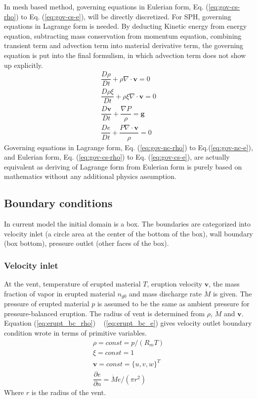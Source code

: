 \documentclass[journal abbreviation, manuscript]{copernicus}
\begin{document}
In mesh based method, governing equations in Eulerian form, Eq. (\ref{eq:gov-cs-rho}) to Eq. (\ref{eq:gov-cs-e}), will be directly discretized. For SPH, governing equations in Lagrange form is needed. By deducting Kinetic energy from energy equation, subtracting mass conservation from momentum equation, combining transient term and advection term into material derivative term, the governing equation is put into the final formulism, in which advection term does not show up explicitly.
\begin{align}
\dfrac{D \rho}{D t} + \rho \nabla \cdot \textbf{v} = 0 \label{eq:gov-nc-rho}\\
\dfrac{D \rho \xi}{D t} + \rho \xi \nabla \cdot \textbf{v} = 0 \label{eq:gov-nc-ks}\\
\dfrac{D \textbf{v}}{D t} + \dfrac{\nabla P}{\rho} =\textbf{g} \label{eq:gov-nc-v}\\
\dfrac{D e}{D t} + \dfrac{P \nabla \cdot \textbf{v}}{\rho} = 0 \label{eq:gov-nc-e}
\end{align}
Governing equations in Lagrange form, Eq. (\ref{eq:gov-nc-rho}) to Eq.(\ref{eq:gov-nc-e}), and Eulerian form, Eq. (\ref{eq:gov-cs-rho}) to Eq. (\ref{eq:gov-cs-e}), are actually equivalent as deriving of Lagrange form from Eulerian form is purely based on mathematics without any additional physics assumption.
\subsection{Boundary conditions}
In current model the initial domain is a box. The boundaries are categorized into velocity inlet (a circle area at the center of the bottom of the box), wall boundary (box bottom), pressure outlet (other faces of the box).
\subsubsection{Velocity inlet}
At the vent, temperature of erupted material $T$, eruption velocity $\textbf{v}$, the mass fraction of vapor in erupted material $n_{g0}$ and mass discharge rate $\dot M$ is given. The pressure of erupted material $p$ is assumed to be the same as ambient pressure for pressure-balanced eruption. The radius of vent is determined from $\rho$, $\dot M$ and $\textbf{v}$. Equation (\ref{eq:erupt_bc_rho}) ~ (\ref{eq:erupt_bc_e}) gives velocity outlet boundary condition wrote in terms of primitive variables.
\begin{align}
\rho =const = p/(R_m T) \label{eq:erupt_bc_rho} \\
\xi=const=1 \label{eq:erupt_bc_xi}\\
\textbf{v} = const =\{u,v,w\}^T \label{eq:erupt_bc_v}\\
\dfrac{\partial e}{\partial n}=\dot M e /(\pi r^2) \label{eq:erupt_bc_e}
\end{align} 
Where $r$ is the radius of the vent.
\end{document}
